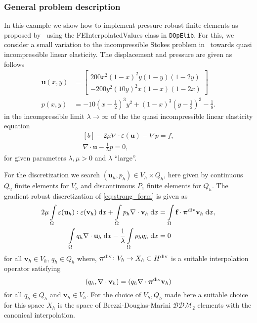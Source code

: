 \subsubsection{General problem description}
 In this example we show how to implement pressure robust finite elements
 as proposed by~\cite{Linke:2014} using the
 FEInterpolatedValues class in \texttt{DOpElib}.
 For this, we consider a small variation to the incompressible
 Stokes problem in~\cite{Linke:2014} towards quasi incompressible
 linear elasticity. The displacement and pressure are given as follows
 \begin{align*}
   \textbf{u}(x, y) & = \begin{bmatrix}
 		    200 x^2 (1-x)^2y(1-y)(1-2y) \\
 		    -200 y^2(10y)^2x(1-x)(1-2x)
 	  	   \end{bmatrix} \\
   p(x,y) & = -10\left(x - \frac{1}{2}\right)^3y^2 + (1-x)^3\left(y-\frac{1}{2}\right)^3 - \frac{1}{8}.
 \end{align*}
 in the incompressible limit $\lambda \rightarrow \infty$ of the 
 the quasi incompressible linear elasticity equation
 \begin{equation}
   \begin{aligned}[b] \label{eq:strong_form}
     -2\mu \nabla \! \cdot \! \varepsilon(\textbf{u}) - \nabla p = f, \\
     \nabla \cdot \textbf{u} - \frac{1}{\lambda} p = 0,
   \end{aligned}
 \end{equation}
 for given parameters $\lambda, \mu > 0$ and $\lambda$ ``large''.

 For the discretization we search $(\textbf{u}_h,p_h) \in V_h \times Q_h$,
 here given by continuous $Q_2$ finite elements for $V_h$ and discontinuous
 $P_1$ finite elements for $Q_h$.
 The gradient robust discretization of \eqref{eq:strong_form} is given as
  \begin{align}
   2\mu \int\limits_\Omega \varepsilon(\textbf{u}_h) : \varepsilon(\textbf{v}_h) \; \mathrm{d} x + 
   \int\limits_\Omega p_h \nabla \cdot \textbf{v}_h \; \mathrm{d} x & = \int\limits_\Omega \textbf{f} \cdot  \bm{\pi}^{\rm{div}} \textbf{v}_h \; \mathrm{d} x  \label{eq:modified_weak_form} , \\
   \int\limits_\Omega q_h \nabla \cdot \textbf{u}_h \; \mathrm{d} x  - \dfrac{1}{\lambda}\int\limits_\Omega p_hq_h \; \mathrm{d} x  & = 0  \label{eq:nearly_incompress_modified}
 \end{align}
 for all $\textbf{v}_h \in V_h$, $q_h \in Q_h$
 where, $\bm{\pi}^{\rm{div}} \colon V_h\rightarrow X_h \subset H^{\rm{div}}$
 is a suitable interpolation operator satisfying
 \[
 (q_h, \nabla \cdot \textbf{v}_h) = (q_h \nabla \cdot \bm{\pi}^{\rm{div}}\textbf{v}_h) 
 \]
 for all $q_h \in Q_h$ and $\textbf{v}_h \in V_h$. For the choice of $V_h,Q_h$ made here a
 suitable choice for this space $X_h$ is the space of Brezzi-Douglas-Marini $\mathcal{BDM}_2$ elements
 with the canonical interpolation.

